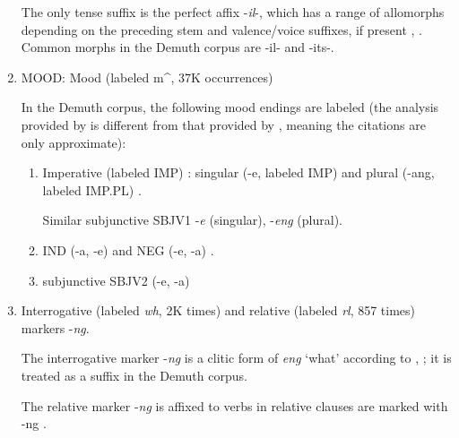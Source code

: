 \documentclass[11pt,letterpaper]{article}
\begin{document}
\begin{enumerate}
    The only tense suffix is the perfect affix -\textit{il}-, which has a range of allomorphs depending on the preceding stem and valence/voice suffixes, if present \cite[]{doke1967textbook}, \cite[p. 167]{guma1971outline}. %
    Common morphs in the Demuth corpus are -il- and -its-.
    
     
    \item MOOD: Mood (labeled m\^{}, 37K occurrences)
    
    In the Demuth corpus, the following mood endings are labeled (the analysis provided by \cite{demuth1992acquisition} is different from that provided by \cite{doke1967textbook}, meaning the citations are only approximate):
    
    \begin{enumerate}
    \item Imperative (labeled IMP) \cite[--387]{doke1967textbook}: singular (-e, labeled IMP) \cite[]{doke1967textbook} and plural (-ang, labeled IMP.PL) \cite[]{doke1967textbook}.
    
    Similar subjunctive SBJV1 -\textit{e} (singular), -\textit{eng} (plural).
    
    \item IND (-a, -e) and NEG  (-e, -a) \cite[--421]{doke1967textbook}.
    
    \item subjunctive SBJV2 (-e, -a)  \cite[--455]{doke1967textbook}
    \end{enumerate}
    
    
    
    \item Interrogative (labeled \textit{wh}, 2K times) and relative (labeled \textit{rl}, 857 times) markers -\textit{ng}.
    
    The interrogative marker -\textit{ng} is a clitic form of \textit{eng} `what' according to \cite[p. 168]{guma1971outline}, \cite[, 320, 714]{doke1967textbook}; it is treated as a suffix in the Demuth corpus.
    
    The relative marker -\textit{ng} is affixed to verbs in relative clauses are marked with -ng \cite[, 793]{doke1967textbook}.
    

\end{enumerate}
\end{document}
